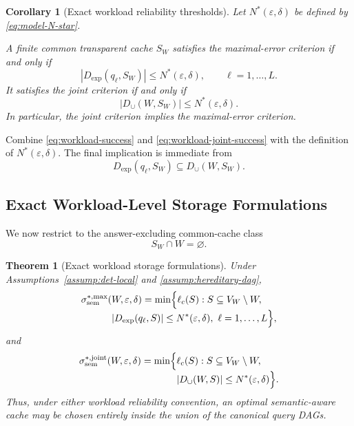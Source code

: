 \documentclass[journal]{IEEEtran}
\makeatletter
\newtheorem{theorem}{Theorem}[section]
\newtheorem{corollary}{Corollary}[section]
\numberwithin{equation}{section}
\renewenvironment{proof}[1][\proofname]{\par
  \pushQED{\qed}%
  \normalfont \topsep6\p@\@plus6\p@\relax
  \trivlist
  \item[\hskip\labelsep
        \itshape
    #1\@addpunct{.}]\ignorespaces
}{%
  \popQED\endtrivlist\@endpefalse
}
\makeatother
\begin{document}
\begin{corollary}[Exact workload reliability thresholds]
\label{cor:workload-thresholds}
Let \(N^*(\varepsilon,\delta)\) be defined by \eqref{eq:model-N-star}.

A finite common transparent cache \(S_W\) satisfies the maximal-error criterion
if and only if
\begin{equation}
  |D_{\mathrm{exp}}(q_\ell,S_W)|
  \le
  N^*(\varepsilon,\delta),
  \qquad \ell=1,\ldots,L.
\label{eq:workload-reliability-constraint}
\end{equation}
It satisfies the joint criterion if and only if
\begin{equation}
  |D_{\cup}(W,S_W)|
  \le
  N^*(\varepsilon,\delta).
\label{eq:workload-joint-reliability-constraint}
\end{equation}
In particular, the joint criterion implies the maximal-error criterion.
\end{corollary}

\begin{proof}
Combine \eqref{eq:workload-success} and \eqref{eq:workload-joint-success} with
the definition of \(N^*(\varepsilon,\delta)\).  The final implication is
immediate from
\[
  D_{\mathrm{exp}}(q_\ell,S_W)\subseteq D_{\cup}(W,S_W).
\]
\end{proof}

\subsection{Exact Workload-Level Storage Formulations}
\label{subsec:workload-exact-optimization}

We now restrict to the answer-excluding common-cache class
\[
  S_W\cap W=\varnothing.
\]

\begin{theorem}[Exact workload storage formulations]
\label{thm:exact-workload-opt}
Under Assumptions~\ref{assump:det-local} and
\ref{assump:hereditary-dag},
\begin{align}
  \sigma_{\mathrm{sem}}^{*,\max}
  (&W,\varepsilon,\delta)
  =
  \min\Bigl\{
    \ell_c(S):
    S\subseteq V_W\setminus W,
    \nonumber\\[-1mm]
    &|D_{\mathrm{exp}}(q_\ell,S)|
      \le N^*(\varepsilon,\delta),
      \ \ell=1,\ldots,L
  \Bigr\},
\label{eq:exact-workload-opt-max}
\end{align}
and
\begin{align}
  \sigma_{\mathrm{sem}}^{*,\mathrm{joint}}
  (W,\varepsilon,\delta)
  =
  \min\Bigl\{
    &\ell_c(S):
    S\subseteq V_W\setminus W,
    \nonumber\\[-1mm]
    &|D_{\cup}(W,S)|
      \le N^*(\varepsilon,\delta)
  \Bigr\}.
\label{eq:exact-workload-opt-joint}
\end{align}
Thus, under either workload reliability convention, an optimal semantic-aware
cache may be chosen entirely inside the union of the canonical query DAGs.
\end{theorem}
\end{document}
